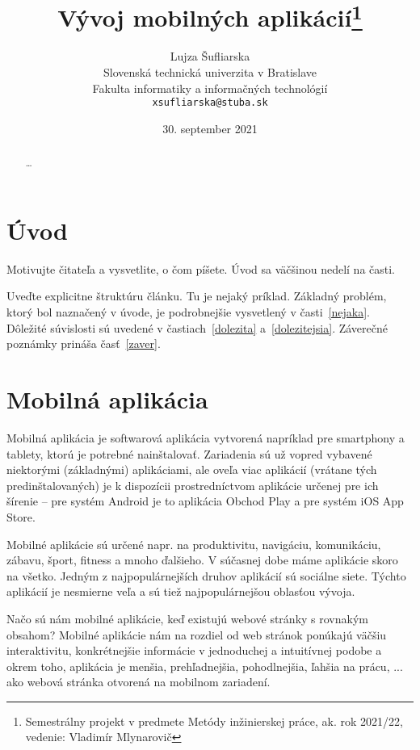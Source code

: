 \documentclass[10pt,twoside,slovak,a4paper]{article}
\title{Vývoj mobilných aplikácií\thanks{Semestrálny projekt v predmete Metódy inžinierskej práce, ak. rok 2021/22, vedenie: Vladimír Mlynarovič}} %
\author{Lujza Šufliarska\\[2pt]
	{\small Slovenská technická univerzita v Bratislave}\\
	{\small Fakulta informatiky a informačných technológií}\\
	{\small \texttt{xsufliarska@stuba.sk}}
	}
\date{\small 30. september 2021} %
\begin{document}
\maketitle

\begin{abstract}

\ldots
\end{abstract}



\section{Úvod}

Motivujte čitateľa a vysvetlite, o čom píšete. Úvod sa väčšinou nedelí na časti.

Uveďte explicitne štruktúru článku. Tu je nejaký príklad.
Základný problém, ktorý bol naznačený v úvode, je podrobnejšie vysvetlený v časti~\ref{nejaka}.
Dôležité súvislosti sú uvedené v častiach~\ref{dolezita} a~\ref{dolezitejsia}.
Záverečné poznámky prináša časť~\ref{zaver}.


\section{Mobilná aplikácia}
\quad Mobilná aplikácia je softwarová aplikácia vytvorená napríklad pre smartphony a tablety, ktorú je potrebné nainštalovať. Zariadenia sú už vopred vybavené niektorými (základnými) aplikáciami, ale oveľa viac aplikácií (vrátane tých predinštalovaných) je k dispozícii prostredníctvom aplikácie určenej pre ich šírenie – pre systém Android je to aplikácia Obchod Play a pre systém iOS App Store.

Mobilné aplikácie sú určené napr. na produktivitu, navigáciu, komunikáciu, zábavu, šport, fitness a mnoho ďalšieho. V súčasnej dobe máme aplikácie skoro na všetko. Jedným z najpopulárnejších druhov aplikácií sú sociálne siete. Týchto aplikácií je nesmierne veľa a sú tiež najpopulárnejšou oblasťou vývoja.

Načo sú nám mobilné aplikácie, keď existujú webové stránky s rovnakým obsahom? Mobilné aplikácie nám na rozdiel od web stránok ponúkajú väčšiu interaktivitu, konkrétnejšie informácie v jednoduchej a intuitívnej podobe a okrem toho, aplikácia je menšia, prehľadnejšia, pohodlnejšia, ľahšia na prácu, ... ako webová stránka otvorená na mobilnom zariadení.	\cite{eYewated1, eliteml, amazon}
\end{document}
